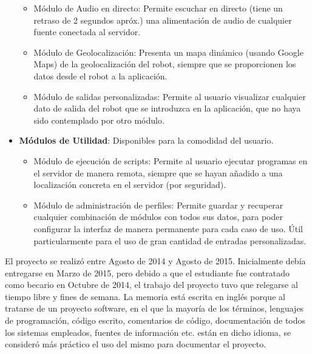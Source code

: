 \begin{itemize}
\begin{itemize}
			\item Módulo de Audio en directo: Permite escuchar en directo (tiene un retraso de 2 segundos apróx.) una 
			alimentación de audio de cualquier fuente conectada al servidor.
			\item Módulo de Geolocalización: Presenta un mapa dinámico (usando Google Maps) de la geolocalización del robot, 
			siempre que se proporcionen los datos desde el robot a la aplicación.
			\item Módulo de salidas personalizadas: Permite al usuario visualizar cualquier dato de salida del robot que se 
			introduzca en la aplicación, que no haya sido contemplado por otro módulo.
		\end{itemize}
	\item \textbf{Módulos de Utilidad}: Disponibles para la comodidad del usuario.
		\begin{itemize}
			\item Módulo de ejecución de scripts: Permite al usuario ejecutar programas en el servidor de manera remota, siempre 
			que se hayan añadido a una localización concreta en el servidor (por seguridad).
			\item Módulo de administración de perfiles: Permite guardar y recuperar cualquier combinación de módulos con todos 
			sus datos, para poder configurar la interfaz de manera permanente para cada caso de uso. Útil particularmente para el 
			uso de gran cantidad de entradas personalizadas.
		\end{itemize}
\end{itemize}
El proyecto se realizó entre Agosto de 2014 y Agosto de 2015. Inicialmente debía entregarse en Marzo de 2015, pero debido a que 
el estudiante fue contratado como becario en Octubre de 2014, el trabajo del proyecto tuvo que relegarse al tiempo libre y fines 
de semana. La memoria está escrita en inglés porque al tratarse de un proyecto software, en el que la mayoría de los términos, 
lenguajes de programación, código escrito, comentarios de código, documentación de todos los sistemas empleados, fuentes de 
información etc. están en dicho idioma, se consideró más práctico el uso del mismo para documentar el proyecto.